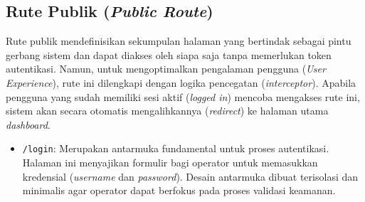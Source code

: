 \subsection{Rute Publik (\textit{Public Route})}
Rute publik mendefinisikan sekumpulan halaman yang bertindak sebagai pintu gerbang sistem dan dapat diakses oleh siapa saja 
tanpa memerlukan token autentikasi. Namun, untuk mengoptimalkan pengalaman pengguna (\textit{User Experience}), rute ini dilengkapi 
dengan logika pencegatan (\textit{interceptor}). Apabila pengguna yang sudah memiliki sesi aktif (\textit{logged in}) mencoba mengakses 
rute ini, sistem akan secara otomatis mengalihkannya (\textit{redirect}) ke halaman utama \textit{dashboard}.
\begin{itemize}
    \item \texttt{/login}: Merupakan antarmuka fundamental untuk proses autentikasi. Halaman ini menyajikan formulir bagi 
    operator untuk memasukkan kredensial (\textit{username} dan \textit{password}). Desain antarmuka dibuat terisolasi dan 
    minimalis agar operator dapat berfokus pada proses validasi keamanan.
\end{itemize}

